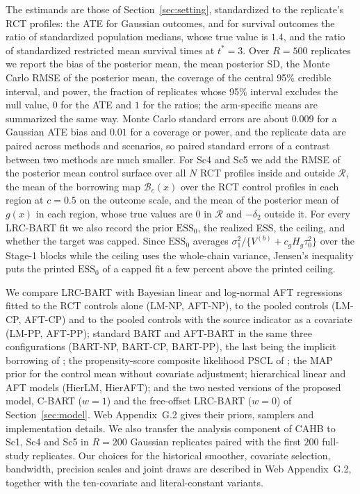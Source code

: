 \documentclass[11pt]{article}
\theoremstyle{definition}
\theoremstyle{plain}
\begin{document}
The estimands are those of Section~\ref{sec:setting}, standardized to the replicate's RCT profiles: the ATE for Gaussian outcomes, and for survival outcomes the ratio of standardized population medians, whose true value is $1.4$, and the ratio of standardized restricted mean survival times at $t^\ast=3$. Over $R=500$ replicates we report the bias of the posterior mean, the mean posterior SD, the Monte Carlo RMSE of the posterior mean, the coverage of the central 95\% credible interval, and power, the fraction of replicates whose 95\% interval excludes the null value, $0$ for the ATE and $1$ for the ratios; the arm-specific means are summarized the same way. Monte Carlo standard errors are about $0.009$ for a Gaussian ATE bias and $0.01$ for a coverage or power, and the replicate data are paired across methods and scenarios, so paired standard errors of a contrast between two methods are much smaller. For Sc4 and Sc5 we add the RMSE of the posterior mean control surface over all $N$ RCT profiles inside and outside $\mathcal R$, the mean of the borrowing map $\mathcal B_c(x)$ over the RCT control profiles in each region at $c=0.5$ on the outcome scale, and the mean of the posterior mean of $g(x)$ in each region, whose true values are $0$ in $\mathcal R$ and $-\delta_2$ outside it. For every LRC-BART fit we also record the prior $\mathrm{ESS}_0$, the realized ESS, the ceiling, and whether the target was capped. Since $\mathrm{ESS}_0$ averages $\sigma_1^2/\{V^{(b)}+c_gH_g\tau_0^2\}$ over the Stage-1 blocks while the ceiling uses the whole-chain variance, Jensen's inequality puts the printed $\mathrm{ESS}_0$ of a capped fit a few percent above the printed ceiling.

We compare LRC-BART with Bayesian linear and log-normal AFT regressions fitted to the RCT controls alone (LM-NP, AFT-NP), to the pooled controls (LM-CP, AFT-CP) and to the pooled controls with the source indicator as a covariate (LM-PP, AFT-PP); standard BART and AFT-BART \citep{Chipman2010BART,Sparapani2021BART} in the same three configurations (BART-NP, BART-CP, BART-PP), the last being the implicit borrowing of \citet{ZhouJi2021}; the propensity-score composite likelihood PSCL of \citet{Chen2020PSCL}; the MAP prior for the control mean without covariate adjustment; hierarchical linear and AFT models (HierLM, HierAFT); and the two nested versions of the proposed model, C-BART ($w=1$) and the free-offset LRC-BART ($w=0$) of Section~\ref{sec:model}. Web Appendix~G.2 gives their priors, samplers and implementation details.
We also transfer the analysis component of CAHB \citep{Jin2023CAHB} to Sc1, Sc4 and Sc5 in $R=200$ Gaussian replicates paired with the first $200$ full-study replicates. Our choices for the historical smoother, covariate selection, bandwidth, precision scales and joint draws are described in Web Appendix~G.2, together with the ten-covariate and literal-constant variants.
\end{document}
